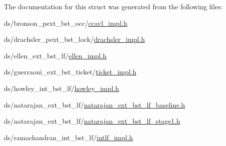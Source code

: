 The documentation for this struct was generated from the following files\+:\begin{DoxyCompactItemize}
\item 
ds/bronson\+\_\+pext\+\_\+bst\+\_\+occ/\hyperlink{ccavl__impl_8h}{ccavl\+\_\+impl.\+h}\item 
ds/drachsler\+\_\+pext\+\_\+bst\+\_\+lock/\hyperlink{drachsler__impl_8h}{drachsler\+\_\+impl.\+h}\item 
ds/ellen\+\_\+ext\+\_\+bst\+\_\+lf/\hyperlink{ellen__impl_8h}{ellen\+\_\+impl.\+h}\item 
ds/guerraoui\+\_\+ext\+\_\+bst\+\_\+ticket/\hyperlink{ticket__impl_8h}{ticket\+\_\+impl.\+h}\item 
ds/howley\+\_\+int\+\_\+bst\+\_\+lf/\hyperlink{howley__impl_8h}{howley\+\_\+impl.\+h}\item 
ds/natarajan\+\_\+ext\+\_\+bst\+\_\+lf/\hyperlink{natarajan__ext__bst__lf__baseline_8h}{natarajan\+\_\+ext\+\_\+bst\+\_\+lf\+\_\+baseline.\+h}\item 
ds/natarajan\+\_\+ext\+\_\+bst\+\_\+lf/\hyperlink{natarajan__ext__bst__lf__stage1_8h}{natarajan\+\_\+ext\+\_\+bst\+\_\+lf\+\_\+stage1.\+h}\item 
ds/ramachandran\+\_\+int\+\_\+bst\+\_\+lf/\hyperlink{intlf__impl_8h}{intlf\+\_\+impl.\+h}\end{DoxyCompactItemize}
